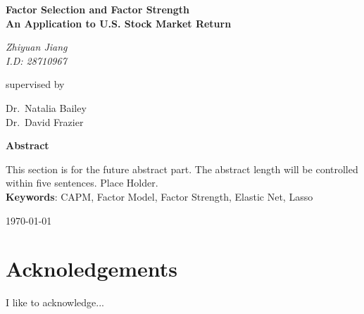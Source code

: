 
	\begin{titlepage}
		{\centering
			\vspace{0.5cm}
			{\huge\bfseries Factor Selection and Factor Strength\\
				\Large An Application to U.S. Stock Market Return\par}
			\vspace{1cm}
			{\Large\itshape Zhiyuan Jiang\\
				I.D: 28710967\par}
			\vfill
			\large supervised by\par
			Dr.~Natalia Bailey\\ Dr.~David Frazier
			
			\vspace{1cm}\textbf{Abstract}\par}
This section is for the future abstract part.
The abstract length will be controlled within five sentences.
Place Holder.\\
		\noindent \textbf{Keywords}: CAPM, Factor Model, Factor Strength, Elastic Net, Lasso
		
		\vfill
		{\centering\large \today\par}
	\end{titlepage}


\section*{Acknoledgements}
I like to acknowledge...




